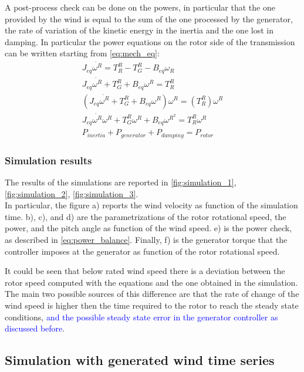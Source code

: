 A post-process check can be done on the powers, in particular that the one provided by the wind is equal to the sum of the one processed by the generator, the rate of variation of the kinetic energy in the inertia and the one lost in damping. In particular the power equations on the rotor side of the transmission can be written starting from \autoref{eq:mech_eq}:
\begin{gather}
    J_{eq}\dot{\omega^{R}} = T_R^R - T_G^R-B_{eq}\omega_R\\
    J_{eq}\dot{\omega^{R}} + T_G^R + B_{eq}\omega^R = T_R^R\\
    \left(J_{eq}\dot{\omega^{R}} + T_G^R + B_{eq}\omega^R\right)\omega^R = \left(T_R^R\right)\omega^R\\
    J_{eq}\dot{\omega^{R}}\omega^{R} + T_G^{R}\omega^{R} + B_{eq}\omega^{R^{2}} = T_R^{R}\omega^{R}\\
    P_{inertia} + P_{generator} + P_{damping} = P_{rotor} 
    \label{eq:power_balance}
\end{gather}

\subsubsection{Simulation results}
The results of the simulations are reported in \autoref{fig:simulation_1}, \ref{fig:simulation_2}, \ref{fig:simulation_3}. \\
In particular, the figure a) reports the wind velocity as function of the simulation time. b), c), and d) are the parametrizations of the rotor rotational speed, the power, and the pitch angle as function of the wind speed. e) is the power check, as described in \autoref{eq:power_balance}. Finally, f) is the generator torque that the controller imposes at the generator as function of the rotor rotational speed. 


It could be seen that below rated wind speed there is a deviation between the rotor speed computed with the equations and the one obtained in the simulation. The main two possible sources of this difference are that the rate of change of the wind speed is higher then the time required to the rotor to reach the steady state conditions, \textcolor{blue}{and the possible steady state error in the generator controller as discussed before}. 

\subsection{Simulation with generated wind time series}\label{sec:wind_series_sim}
